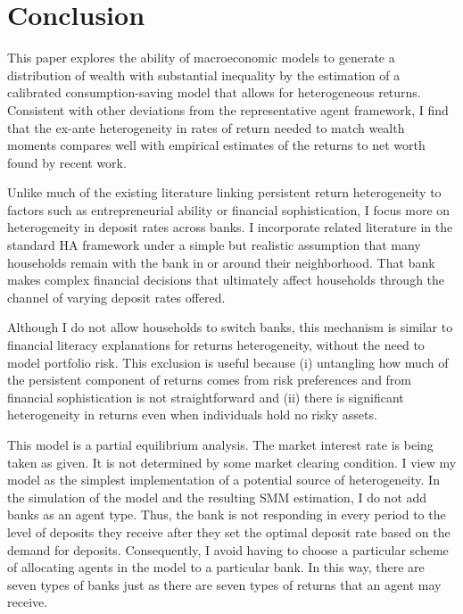 \onlyinsubfile{\setcounter{section}{7}}
\section{Conclusion}
\notinsubfile{\label{sec:Conclusion}}

\par This paper explores the ability of macroeconomic models to generate a distribution of wealth with substantial inequality by the estimation of a calibrated consumption-saving model that allows for heterogeneous returns. Consistent with other deviations from the representative agent framework, I find that the ex-ante heterogeneity in rates of return needed to match wealth moments compares well with empirical estimates of the returns to net worth found by recent work.   

\par Unlike much of the existing literature linking persistent return heterogeneity to factors such as entrepreneurial ability or financial sophistication, I focus more on heterogeneity in  deposit rates across banks. I incorporate related literature in the standard HA framework under a simple but realistic assumption that many households remain  with the bank in or around their neighborhood. That bank makes complex financial decisions that ultimately affect households through the channel of varying deposit rates offered.

\par Although I do not allow households to switch banks, this mechanism is similar to financial literacy explanations for returns heterogeneity, without the need to model portfolio risk. This exclusion is useful because (i) untangling how much of the persistent component of returns comes from risk preferences and from financial sophistication is not straightforward and (ii) there is significant heterogeneity in returns even when individuals hold no risky assets.

\par This model is a partial equilibrium analysis. The market interest rate is being taken as given. It is not determined by some market clearing condition. I view my model as the simplest implementation of a potential source of heterogeneity. In the simulation of the model and the resulting SMM estimation, I do not add banks as an agent type. Thus, the bank is not responding in every period to the level of deposits they receive after they set the optimal deposit rate based on the demand for deposits. Consequently, I avoid having to choose a particular scheme of allocating agents in the model to a particular bank. In this way, there are seven types of banks just as there are seven types of returns that an agent may receive.

